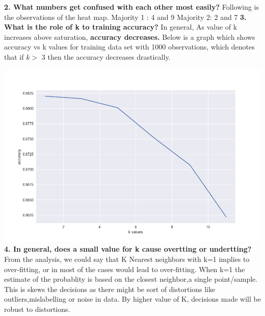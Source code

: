 \documentclass[11pt]{article}
\begin{document}
\textbf{2. What numbers get confused with each other most easily?}\newline
Following is the observations of the heat map.
\newline Majority 1 : 4 and 9 
\newline Majority 2: 2 and 7
\newline 
\newline\textbf{ 3. What is the role of k to training accuracy?}\newline
\newline In general, As value of k increases above saturation, \textbf{accuracy decreases.}
\newline Below is a graph which shows accuracy vs k values for training data set with 1000 observations, which denotes that if $k >$ 3  then the accuracy decreases drastically.\newline

\includegraphics[width=\textwidth]{answer3.png}
\textbf{4. In general, does a small value for k cause overtting or undertting?} \newline
\newline
From the analysis, we could say that K Nearest neighbors  with k=1 implies  to over-fitting, or in most of the cases would lead to over-fitting.\newline
\newline
When k=1 the estimate of the probablity is  based on the closest neighbor,a  single point/sample. This is skews the decisions as there might be sort of distortions like  outliers,mislabelling or noise in data. By higher value of K, decisions made will be robust to distortions.\newline
\end{document}
